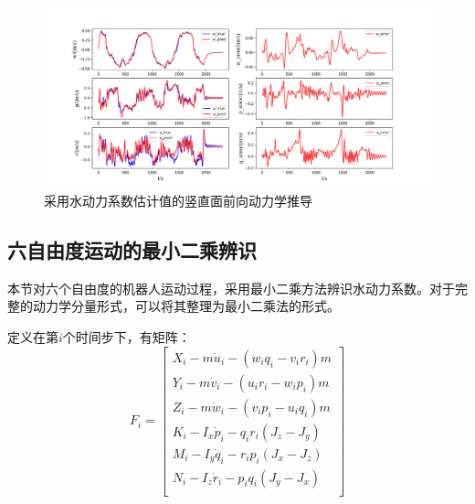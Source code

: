 \begin{figure}[hbt]
    \centering
    \includegraphics[width=\linewidth]{images/chapter3/竖直面最小二乘辨识.png}
    \caption{采用水动力系数估计值的竖直面前向动力学推导}
    \label{f.dynamic_forward_identified_vertical}
\end{figure}

\subsection{六自由度运动的最小二乘辨识}
本节对六个自由度的机器人运动过程，采用最小二乘方法辨识水动力系数。对于完整的动力学分量形式，可以将其整理为最小二乘法的形式。

定义在第$i$个时间步下，有矩阵：
\begin{equation}
    F_i
    =\left[
    \begin{matrix}
        X_i-m\dot{u}_i-(w_iq_i-v_ir_i)m\\
        Y_i-m\dot{v}_i-(u_ir_i-w_ip_i)m\\
        Z_i-m\dot{w}_i-(v_ip_i-u_iq_i)m\\
        K_i-I_x\dot{p}_i-q_ir_i(J_z-J_y)\\
        M_i-I_y\dot{q}_i-r_ip_i(J_x-J_z)\\
        N_i-I_z\dot{r}_i-p_iq_i(J_y-J_x)\\
    \end{matrix}
\right]
\end{equation}


